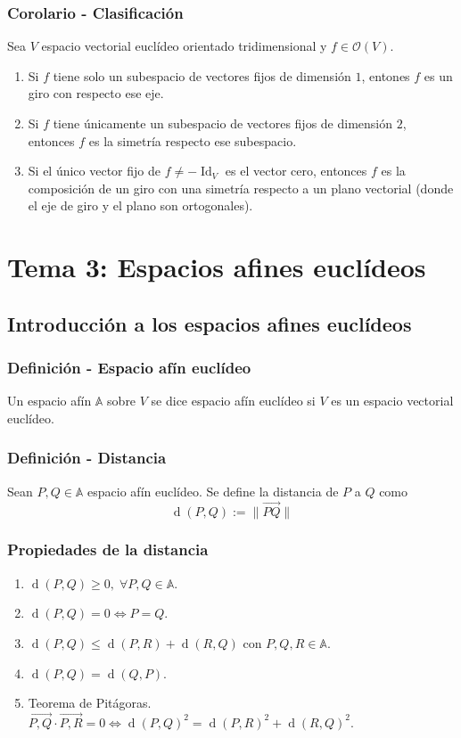 \documentclass[12pt, a4paper, ones, notitlepage, openany,titlepage]{article}
\newcommand{\distancia}[1]{\operatorname{d}(#1)}
\begin{document}
\subsubsection{Corolario - Clasificación}
Sea $V$ espacio vectorial euclídeo orientado tridimensional y $f \in \mathcal{O}(V)$.
\begin{enumerate}[label=(\arabic*)]
	\item Si $f$ tiene solo un subespacio de vectores fijos de dimensión $1$, entones $f$ es un giro con respecto ese eje.
	\item Si $f$ tiene únicamente un subespacio de vectores fijos de dimensión $2$, entonces $f$ es la simetría respecto ese subespacio.
	\item Si el único vector fijo de $f \neq -\operatorname{Id}_V$ es el vector cero, entonces $f$ es la composición de un giro con una simetría respecto a un plano vectorial (donde el eje de giro y el plano son ortogonales).
\end{enumerate}

\newpage

\section{Tema 3: Espacios afines euclídeos}

\subsection{Introducción a los espacios afines euclídeos}

\subsubsection{Definición - Espacio afín euclídeo}
Un espacio afín $\mathbb{A}$ sobre $V$ se dice espacio afín euclídeo si $V$ es un espacio vectorial euclídeo.

\subsubsection{Definición - Distancia}
Sean $P,Q \in \mathbb{A}$ espacio afín euclídeo. Se define la distancia de $P$ a $Q$ como
$$
\operatorname{d}(P,Q) := \|\overrightarrow{PQ}\|
$$

\subsubsection{Propiedades de la distancia}
\begin{enumerate}[label=(\arabic*)]
	\item $\operatorname{d}(P,Q) \ge 0, \; \forall P,Q \in \mathbb{A}$.
	\item $\operatorname{d}(P,Q) = 0 \Longleftrightarrow P = Q$.
	\item $\operatorname{d}(P,Q) \le \operatorname{d}(P,R) + \operatorname{d}(R,Q) \text{ con } P,Q,R \in \mathbb{A}$.
	\item $\distancia{P,Q} = \distancia{Q,P}$.
	\item Teorema de Pitágoras. $\overrightarrow{P,Q} \cdot \overrightarrow{P,R} = 0 \Longleftrightarrow \distancia{P,Q}^2 = \distancia{P,R}^2 + \distancia{R,Q}^2$.
\end{enumerate}
\end{document}
